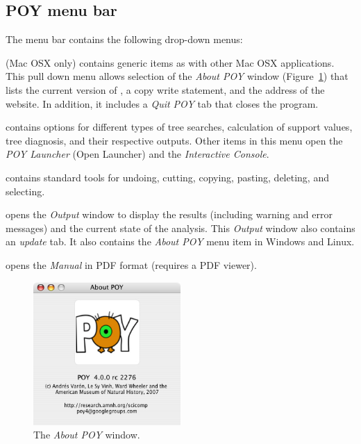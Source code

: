 \subsection{POY menu bar}
The menu bar contains the following drop-down menus:
\begin{description}
\setlength{\labelsep}{5pt}
\setlength{\itemindent}{0pt}%
\item[POY] (Mac OSX only) contains generic items as with other Mac OSX applications. This pull down menu allows selection of the \emph{About POY} window (Figure~\ref{fig:about_window}) that lists the current version of \poy, a copy write statement, and the address of the \poy website. In addition, it includes a \emph{Quit POY} tab that closes the program. 
\item[Analyses]    contains options for different types of tree searches, calculation of support values, tree diagnosis, and their respective outputs. Other items in this menu open the \emph{POY Launcher} (Open Launcher) and the \emph{Interactive Console}.
\item[Edit] contains standard tools for undoing, cutting, copying, pasting, deleting, and selecting.
\item[View] opens the \emph{Output} window to display the results (including warning and error messages) and the current state of the analysis. 
This \emph{Output} window also contains an \emph{update} tab.  It also contains the \emph{About POY} menu item in Windows and Linux.  
\item[Help] opens the \poy \emph{Manual} in PDF format (requires a PDF viewer).
\end{description}

\begin{figure}[htpb]
    \begin{center}
        \includegraphics[width=0.5\textwidth]{doc/figures/about_window.jpg}
    \end{center}
    \caption{The \emph{About POY} window.}
    \label{fig:about_window}
        
\end{figure}

